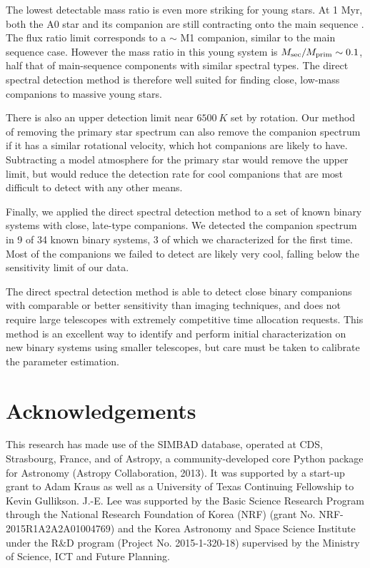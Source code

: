 \documentclass{emulateapj}
\begin{document}
The lowest detectable mass ratio is even more striking for young stars. At 1 Myr, both the A0 star and its companion are still contracting onto the main sequence \citep{Bressan2012}. The flux ratio limit corresponds to a $\sim$ M1 companion, similar to the main sequence case. However the mass ratio in this young system is $M_{\rm  sec}/M_{\rm prim} \sim 0.1$, half that of main-sequence components with similar spectral types. The direct spectral detection method is therefore well suited for finding close, low-mass companions to massive young stars.

There is also an upper detection limit near $6500\ K$ set by rotation. Our method of removing the primary star spectrum can also remove the companion spectrum if it has a similar rotational velocity, which hot companions are likely to have. Subtracting a model atmosphere for the primary star would remove the upper limit, but would reduce the detection rate for cool companions that are most difficult to detect with any other means.

Finally, we applied the direct spectral detection method to a set of known binary systems with close, late-type companions. We detected the companion spectrum in 9 of 34 known binary systems, 3 of which we characterized for the first time. Most of the companions we failed to detect are likely very cool, falling below the sensitivity limit of our data.

The direct spectral detection method is able to detect close binary companions with comparable or better sensitivity than imaging techniques, and does not require large telescopes with extremely competitive time allocation requests. This method is an excellent way to identify and perform initial characterization on new binary systems using smaller telescopes, but care must be taken to calibrate the parameter estimation. 

\section*{Acknowledgements}
This research has made use of the SIMBAD database, operated at CDS, Strasbourg, France, and of Astropy, a community-developed core Python package for Astronomy (Astropy Collaboration, 2013).
It was supported by a start-up grant to Adam Kraus as well as a University of Texas Continuing Fellowship to Kevin Gullikson. J.-E. Lee was supported by the Basic Science Research Program through the National Research Foundation of Korea (NRF) (grant No. NRF-2015R1A2A2A01004769) and the Korea
Astronomy and Space Science Institute under the R\&D program (Project No. 2015-1-320-18) supervised by the Ministry of Science, ICT and Future Planning.
\end{document}
